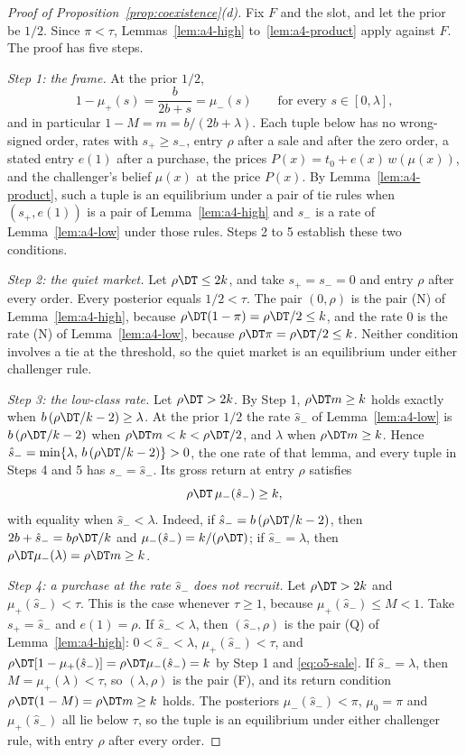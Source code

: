 \begin{proof}[Proof of Proposition~\ref{prop:coexistence}(d)]
Fix \(F\) and the slot, and let the prior be \(1/2\). Since \(\pi<\tau\), Lemmas~\ref{lem:a4-high} to~\ref{lem:a4-product}
apply against \(F\). The proof has five steps.

\emph{Step 1: the frame.} At the prior \(1/2\),
\[
1-\mu_+(s)=\frac{b}{2b+s}=\mu_-(s)\qquad\text{for every }s\in[0,\lambda],
\]
and in particular \(1-M=m=b/(2b+\lambda)\). Each tuple below has no wrong-signed order, rates with \(s_+\ge s_-\),
entry \(\rho\) after a sale and after the zero order, a stated entry \(e(1)\) after a purchase, the prices
\(P(x)=t_0+e(x)\,w(\mu(x))\), and the challenger's belief \(\mu(x)\) at the price \(P(x)\). By
Lemma~\ref{lem:a4-product}, such a tuple is an equilibrium under a pair of tie rules when \((s_+,e(1))\) is a pair of
Lemma~\ref{lem:a4-high} and \(s_-\) is a rate of Lemma~\ref{lem:a4-low} under those rules. Steps 2 to 5 establish these
two conditions.

\emph{Step 2: the quiet market.} Let \(\rho\DT\le2k\), and take \(s_+=s_-=0\) and entry \(\rho\) after every order.
Every posterior equals \(1/2<\tau\). The pair \((0,\rho)\) is the pair (N) of Lemma~\ref{lem:a4-high}, because
\(\rho\DT(1-\pi)=\rho\DT/2\le k\), and the rate \(0\) is the rate (N) of Lemma~\ref{lem:a4-low}, because
\(\rho\DT\pi=\rho\DT/2\le k\). Neither condition involves a tie at the threshold, so the quiet market is an
equilibrium under either challenger rule.

\emph{Step 3: the low-class rate.} Let \(\rho\DT>2k\). By Step 1, \(\rho\DT m\ge k\) holds exactly when
\(b\,(\rho\DT/k-2)\ge\lambda\). At the prior \(1/2\) the rate \(\hat s_-\) of Lemma~\ref{lem:a4-low} is
\(b\,(\rho\DT/k-2)\) when \(\rho\DT m<k<\rho\DT/2\), and \(\lambda\) when \(\rho\DT m\ge k\). Hence
\(\hat s_-=\min\{\lambda,\,b\,(\rho\DT/k-2)\}>0\), the one rate of that lemma, and every tuple in Steps 4 and 5 has
\(s_-=\hat s_-\). Its gross return at entry \(\rho\) satisfies
\begin{equation}\label{eq:o5-sale}
\rho\DT\,\mu_-(\hat s_-)\ge k ,
\end{equation}
with equality when \(\hat s_-<\lambda\). Indeed, if \(\hat s_-=b\,(\rho\DT/k-2)\), then \(2b+\hat s_-=b\rho\DT/k\) and
\(\mu_-(\hat s_-)=k/(\rho\DT)\); if \(\hat s_-=\lambda\), then \(\rho\DT\mu_-(\lambda)=\rho\DT m\ge k\).

\emph{Step 4: a purchase at the rate \(\hat s_-\) does not recruit.} Let \(\rho\DT>2k\) and \(\mu_+(\hat s_-)<\tau\). This is the
case whenever \(\tau\ge1\), because \(\mu_+(\hat s_-)\le M<1\). Take \(s_+=\hat s_-\) and \(e(1)=\rho\). If \(\hat s_-<\lambda\), then
\((\hat s_-,\rho)\) is the pair (Q) of Lemma~\ref{lem:a4-high}: \(0<\hat s_-<\lambda\), \(\mu_+(\hat s_-)<\tau\), and
\(\rho\DT[1-\mu_+(\hat s_-)]=\rho\DT\mu_-(\hat s_-)=k\) by Step 1 and \eqref{eq:o5-sale}. If \(\hat s_-=\lambda\), then
\(M=\mu_+(\lambda)<\tau\), so \((\lambda,\rho)\) is the pair (F), and its return condition
\(\rho\DT(1-M)=\rho\DT m\ge k\) holds. The posteriors \(\mu_-(\hat s_-)<\pi\), \(\mu_0=\pi\) and \(\mu_+(\hat s_-)\) all lie below
\(\tau\), so the tuple is an equilibrium under either challenger rule, with entry \(\rho\) after every order.


\end{proof}

